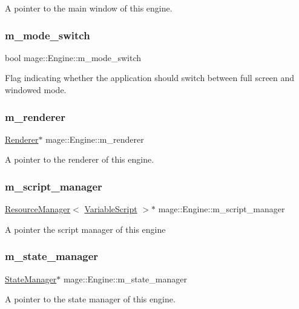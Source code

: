 A pointer to the main window of this engine. \hypertarget{classmage_1_1_engine_aa5cb2e0b7bb2c4a9020e79ab832ee221}{}\label{classmage_1_1_engine_aa5cb2e0b7bb2c4a9020e79ab832ee221} 
\subsubsection{\texorpdfstring{m\+\_\+mode\+\_\+switch}{m\_mode\_switch}}
{\footnotesize\ttfamily bool mage\+::\+Engine\+::m\+\_\+mode\+\_\+switch\hspace{0.3cm}{\ttfamily [protected]}}

Flag indicating whether the application should switch between full screen and windowed mode. \hypertarget{classmage_1_1_engine_ad2107f910b4471ee3d3934588c6d36c3}{}\label{classmage_1_1_engine_ad2107f910b4471ee3d3934588c6d36c3} 
\subsubsection{\texorpdfstring{m\+\_\+renderer}{m\_renderer}}
{\footnotesize\ttfamily \hyperlink{classmage_1_1_renderer}{Renderer}$\ast$ mage\+::\+Engine\+::m\+\_\+renderer\hspace{0.3cm}{\ttfamily [protected]}}

A pointer to the renderer of this engine. \hypertarget{classmage_1_1_engine_a4faf1b8f94a84be27dd63054bf6fe36d}{}\label{classmage_1_1_engine_a4faf1b8f94a84be27dd63054bf6fe36d} 
\subsubsection{\texorpdfstring{m\+\_\+script\+\_\+manager}{m\_script\_manager}}
{\footnotesize\ttfamily \hyperlink{classmage_1_1_resource_manager}{Resource\+Manager}$<$ \hyperlink{classmage_1_1_variable_script}{Variable\+Script} $>$$\ast$ mage\+::\+Engine\+::m\+\_\+script\+\_\+manager\hspace{0.3cm}{\ttfamily [protected]}}

A pointer the script manager of this engine \hypertarget{classmage_1_1_engine_a7a0c463c67c3375b896809be9046113d}{}\label{classmage_1_1_engine_a7a0c463c67c3375b896809be9046113d} 
\subsubsection{\texorpdfstring{m\+\_\+state\+\_\+manager}{m\_state\_manager}}
{\footnotesize\ttfamily \hyperlink{classmage_1_1_state_manager}{State\+Manager}$\ast$ mage\+::\+Engine\+::m\+\_\+state\+\_\+manager\hspace{0.3cm}{\ttfamily [protected]}}

A pointer to the state manager of this engine. 